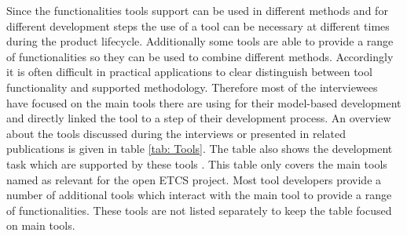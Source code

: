 \documentclass{./template/openetcs_report}
\begin{document}
Since the functionalities tools support can be used in different methods and for different development steps the use of a tool can be necessary at different times during the product lifecycle. Additionally some tools are able to provide a range of functionalities so they can be used to combine different methods. Accordingly it is  often difficult in practical applications to clear distinguish between tool functionality and supported methodology. Therefore most of the interviewees have focused on the main tools there are using for their model-based development and directly linked the tool to a step of their development process. An overview about the tools discussed during the interviews or presented in related publications is given in table \ref{tab: Tools}. The table also shows the development task which are supported by these tools . This table only covers the main tools named as relevant for the open ETCS project. Most tool developers provide a number of additional tools which interact with the main tool to provide a range of functionalities. These tools are not listed separately to keep the table focused on main tools.

\end{document}
